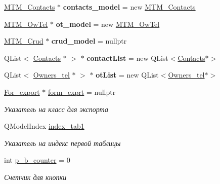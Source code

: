 \begin{DoxyCompactItemize}
\item 
\mbox{\label{class_main_window_acb05e63c8e76e558617ff1c7ec5de518}} 
\mbox{\hyperlink{class_m_t_m___contacts}{M\+T\+M\+\_\+\+Contacts}} $\ast$ {\bfseries contacts\+\_\+model} = new \mbox{\hyperlink{class_m_t_m___contacts}{M\+T\+M\+\_\+\+Contacts}}
\item 
\mbox{\label{class_main_window_acb6848c524534a82963f1ac911aaaf87}} 
\mbox{\hyperlink{class_m_t_m___ow_tel}{M\+T\+M\+\_\+\+Ow\+Tel}} $\ast$ {\bfseries ot\+\_\+model} = new \mbox{\hyperlink{class_m_t_m___ow_tel}{M\+T\+M\+\_\+\+Ow\+Tel}}
\item 
\mbox{\label{class_main_window_ad73929fedbed6c2a7ee4a312f199d287}} 
\mbox{\hyperlink{class_m_t_m___crud}{M\+T\+M\+\_\+\+Crud}} $\ast$ {\bfseries crud\+\_\+model} = nullptr
\item 
\mbox{\label{class_main_window_a45cda5a50b2e526a64875d2e7a943872}} 
Q\+List$<$ \mbox{\hyperlink{class_contacts}{Contacts}} $\ast$ $>$ $\ast$ {\bfseries contact\+List} = new Q\+List$<$\mbox{\hyperlink{class_contacts}{Contacts}}$\ast$$>$
\item 
\mbox{\label{class_main_window_a01416c331bd0596f51c4eb5c6de9f29e}} 
Q\+List$<$ \mbox{\hyperlink{class_owners__tel}{Owners\+\_\+tel}} $\ast$ $>$ $\ast$ {\bfseries ot\+List} = new Q\+List$<$\mbox{\hyperlink{class_owners__tel}{Owners\+\_\+tel}}$\ast$$>$
\item 
\mbox{\label{class_main_window_a5c0a4e9a066d2a81304505ba6a68de8b}} 
\mbox{\hyperlink{class_for__export}{For\+\_\+export}} $\ast$ \mbox{\hyperlink{class_main_window_a5c0a4e9a066d2a81304505ba6a68de8b}{form\+\_\+exprt}} = nullptr
\begin{DoxyCompactList}\small\item\em Указатель на класс для экспорта \end{DoxyCompactList}\item 
\mbox{\label{class_main_window_a291d1526f0acfa6eb28d413ef38fdea2}} 
Q\+Model\+Index \mbox{\hyperlink{class_main_window_a291d1526f0acfa6eb28d413ef38fdea2}{index\+\_\+tab1}}
\begin{DoxyCompactList}\small\item\em Указатель на индекс первой таблицы \end{DoxyCompactList}\item 
\mbox{\label{class_main_window_a4fbd9aa645363f2720f84c3e41ecfd3e}} 
int \mbox{\hyperlink{class_main_window_a4fbd9aa645363f2720f84c3e41ecfd3e}{p\+\_\+b\+\_\+counter}} = 0
\begin{DoxyCompactList}\small\item\em Счетчик для кнопки \end{DoxyCompactList}\end{DoxyCompactItemize}


